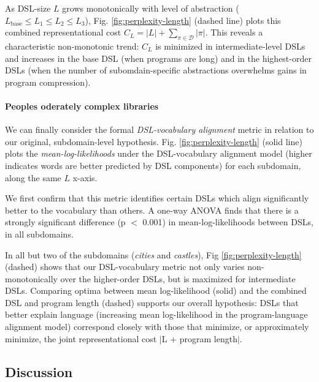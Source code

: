 \documentclass[10pt,letterpaper]{article}
\begin{document}
As DSL-size $L$ grows monotonically with level of abstraction ($L_{\text{base}} \leq L_1 \leq L_2 \leq L_3$), Fig. \ref{fig:perplexity-length} (dashed line) plots this combined representational cost $C_L = |L| + \sum_{\pi \in \mathcal{D}}{|\pi|}$. This reveals a characteristic non-monotonic trend: $C_L$ is minimized in intermediate-level DSLs and increases in the base DSL (when programs are long) and in the highest-order DSLs (when the number of subomdain-specific abstractions overwhelms gains in program compression).

\paragraph{Peoples oderately complex libraries}
We can finally consider the formal \textit{DSL-vocabulary alignment} metric in relation to our original, subdomain-level hypothesis. Fig. \ref{fig:perplexity-length} (solid line) plots the \textit{mean-log-likelihoods} under the DSL-vocabulary alignment model (higher indicates words are better predicted by DSL components) for each subdomain, along the same $L$ x-axis.

We first confirm that this metric identifies certain DSLs which align significantly better to the vocabulary than others. A one-way ANOVA finds that there is a strongly significant difference (p $<$ 0.001) in mean-log-likelihoods between DSLs, in all subdomains. 

In all but two of the subdomains (\textit{cities} and \textit{castles}), Fig \ref{fig:perplexity-length} (dashed) shows that our DSL-vocabulary metric not only varies non-monotonically over the higher-order DSLs, but is maximized for intermediate DSLs. Comparing optima between mean log-likelihood (solid) and the combined DSL and program length (dashed) supports our overall hypothesis: DSLs that better explain language (increasing mean log-likelihood in the program-language alignment model) correspond closely with those that minimize, or approximately minimize, the joint representational cost $|$L + program length$|$.


\subsection{Discussion}
\end{document}
